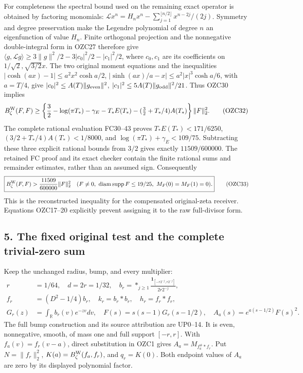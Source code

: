 \documentclass[
  10pt,
  a4paper,
]{article}
\begin{document}
For completeness the spectral bound used on the remaining exact operator
is obtained by factoring monomials:
\(\mathcal Lx^n=H_nx^n-\sum_{j=1}^{\lfloor n/2\rfloor}x^{n-2j}/(2j)\).
Symmetry and degree preservation make the Legendre polynomial of degree
\(n\) an eigenfunction of value \(H_n\). Finite orthogonal projection
and the nonnegative double-integral form in OZC27 therefore give
\(\langle g,\mathcal Lg\rangle\ge3\|g\|^2/2-3|c_0|^2/2-|c_1|^2/2\),
where \(c_0,c_1\) are its coefficients on \(1/\sqrt2,\sqrt{3/2}x\). The
two original moment equations and the inequalities
\(|\cosh(ax)-1|\le a^2x^2\cosh a/2\),
\(|\sinh(ax)/a-x|\le a^2|x|^3\cosh a/6\), with \(a=T/4\), give
\(|c_0|^2\le A(T)\|g_{\rm even}\|^2\),
\(|c_1|^2\le5A(T)\|g_{\rm odd}\|^2/21\). Thus OZC30 implies \[
B_\zeta^{\rm W}(F,F)\ge
\left\{\frac32-\log(\pi T_*)-\gamma_E
-T_*E(T_*)-(\tfrac32+T_*/4)A(T_*)\right\}\|F\|_2^2.
\tag{OZC32}
\] The complete rational evaluation FC30--43 proves
\(T_*E(T_*)<171/6250\), \((3/2+T_*/4)A(T_*)<1/8000\), and
\(\log(\pi T_*)+\gamma_E<109/75\). Subtracting these three explicit
rational bounds from \(3/2\) gives exactly \(11509/600000\). The
retained FC proof and its exact checker contain the finite rational sums
and remainder estimates, rather than an assumed sign. Consequently \[
\boxed{B_\zeta^{\rm W}(F,F)>\frac{11509}{600000}\|F\|_2^2
\quad(F\ne0,\ \operatorname{diam}\operatorname{supp}F\le19/25,
\ M_F(0)=M_F(1)=0).}
\tag{OZC33}
\] This is the reconstructed inequality for the compensated
original-zeta receiver. Equations OZC17--20 explicitly prevent assigning
it to the raw full-divisor form.

\subsection{5. The fixed original test and the complete trivial-zero
sum}\label{the-fixed-original-test-and-the-complete-trivial-zero-sum}

Keep the unchanged radius, bump, and every multiplier: \[
\begin{aligned}
r&=1/64,\quad d=2r=1/32,\quad
b_r=*_{j\ge1}\frac{\mathbf1_{[-r2^{-j},r2^{-j}]}}{2r2^{-j}},\\
f_r&=(D^2-1/4)b_r,\quad k_r=b_r*b_r,\quad h_r=f_r*f_r,\\
G_r(z)&=\int_{\mathbb R}b_r(v)e^{-zv}dv,\quad
F(s)=s(s-1)G_r(s-1/2),\quad
A_a(s)=e^{a(s-1/2)}F(s)^2.
\end{aligned}
\tag{OZC34}
\] The full bump construction and its source attribution are UP0--14. It
is even, nonnegative, smooth, of mass one and full support \([-r,r]\).
With \(f_a(v)=f_r(v-a)\), direct substitution in OZC1 gives
\(A_a=M_{f_a^\#*f_r}\). Put \(N=\|f_r\|_2^2\),
\(K(a)=B_\zeta^{\rm W}(f_a,f_r)\), and \(q_r=K(0)\). Both endpoint
values of \(A_a\) are zero by its displayed polynomial factor.
\end{document}

